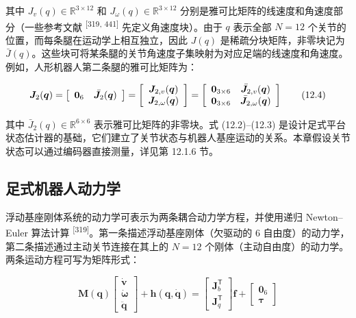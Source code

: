 其中 $J_v(q)\in\mathbb{R}^{3\times12}$ 和 $J_\omega(q)\in\mathbb{R}^{3\times12}$ 分别是雅可比矩阵的线速度和角速度部分（一些参考文献 \textsuperscript{[319, 441]} 先定义角速度块）。由于 $q$ 表示全部 $N=12$ 个关节的位置，而每条腿在运动学上相互独立，因此 $J(q)$ 是稀疏分块矩阵，非零块记为 $\bar J(q)$。这些块可将某条腿的关节角速度子集映射为对应足端的线速度和角速度。例如，人形机器人第二条腿的雅可比矩阵为：

\begin{equation}
\boldsymbol {J} _ {2} (\boldsymbol {q}) = \left[ \begin{array}{c c} \mathbf {0} _ {6} & \bar {\boldsymbol {J}} _ {2} (\boldsymbol {q}) \end{array} \right] = \left[ \begin{array}{c} \boldsymbol {J} _ {2, v} (\boldsymbol {q}) \\ \boldsymbol {J} _ {2, \omega} (\boldsymbol {q}) \end{array} \right] = \left[ \begin{array}{c c} \mathbf {0} _ {3 \times 6} & \bar {\boldsymbol {J}} _ {2, v} (\boldsymbol {q}) \\ \mathbf {0} _ {3 \times 6} & \bar {\boldsymbol {J}} _ {2, \omega} (\boldsymbol {q}) \end{array} \right]\tag{12.4}
\end{equation}

其中 $\bar J_2(q)\in\mathbb{R}^{6\times6}$ 表示雅可比矩阵的非零块。式 (12.2)--(12.3) 是设计足式平台状态估计器的基础，它们建立了关节状态与机器人基座运动的关系。本章假设关节状态可以通过编码器直接测量，详见第 12.1.6 节。

\subsection{足式机器人动力学}

浮动基座刚体系统的动力学可表示为两条耦合动力学方程，并使用递归 Newton--Euler 算法计算 \textsuperscript{[319]}。第一条描述浮动基座刚体（欠驱动的 6 自由度）的动力学，第二条描述通过主动关节连接在其上的 $N=12$ 个刚体（主动自由度）的动力学。两条运动方程可写为矩阵形式：

\begin{equation}
\boldsymbol {M} (\boldsymbol {q}) \left[ \begin{array}{c} \dot {\boldsymbol {v}} \\ \dot {\boldsymbol {\omega}} \\ \ddot {\boldsymbol {q}} \end{array} \right] + \boldsymbol {h} (\boldsymbol {q}, \dot {\boldsymbol {q}}) = \left[ \begin{array}{c} \boldsymbol {J} _ {b} ^ {\mathsf {T}} \\ \boldsymbol {J} _ {q} ^ {\mathsf {T}} \end{array} \right] \boldsymbol {f} + \left[ \begin{array}{c} \boldsymbol {0} _ {6} \\ \boldsymbol {\tau} \end{array} \right]\tag{12.5}
\end{equation}

